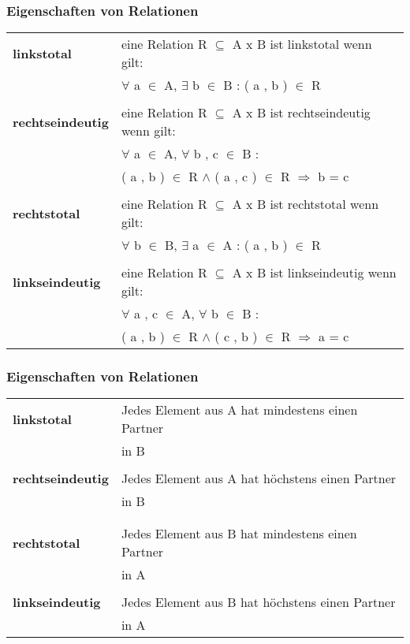 \documentclass{beamer}
\begin{document}
\begin {frame}
	\frametitle {Eigenschaften von Relationen}
	\begin {tabular} {l l}
		\textbf {linkstotal} 			& eine Relation R $ \subseteq $ A x B ist linkstotal wenn gilt: \\
							& $ \forall $ a $ \in $ A, $ \exists $ b $ \in $ B : ( a , b ) $ \in $ R \\
		\\
		\textbf {rechtseindeutig} 		&eine Relation R $ \subseteq $ A x B ist rechtseindeutig wenn gilt: \\
							& $ \forall $ a $ \in $ A, $ \forall $ b , c $ \in $ B : \\ 
							& ( a , b ) $ \in $ R $ \land $ ( a , c ) $ \in $ R $\Rightarrow$ b = c \\
		\\
		\textbf {rechtstotal } 		& eine Relation R $ \subseteq $ A x B ist rechtstotal wenn gilt: \\
							& $ \forall $ b $ \in $ B, $ \exists $ a $ \in $ A : ( a , b ) $ \in $ R \\
		\\
		\textbf {linkseindeutig} 		&eine Relation R $ \subseteq $ A x B ist linkseindeutig wenn gilt: \\
							& $ \forall $ a , c $ \in $ A, $ \forall $ b $ \in $ B : \\ 
							& ( a , b ) $ \in $ R $ \land $ ( c , b ) $ \in $ R $\Rightarrow$ a = c \\
	\end {tabular}
\end {frame}

\begin {frame}
	\frametitle {Eigenschaften von Relationen}
	\begin {tabular} {l l}
		\textbf {linkstotal} 			& Jedes Element aus A hat mindestens einen Partner\\  &in B \\
		\\
		\textbf {rechtseindeutig} 		& Jedes Element aus A hat höchstens einen Partner\\ & in B \\ \\
		\\
		\textbf {rechtstotal } 		& Jedes Element aus B hat mindestens einen Partner\\ & in A
		\\
		\\
		\textbf {linkseindeutig} 		& Jedes Element aus B hat höchstens einen Partner\\&  in A 
		\\
	\end {tabular}
\end {frame}	
\end{document}
